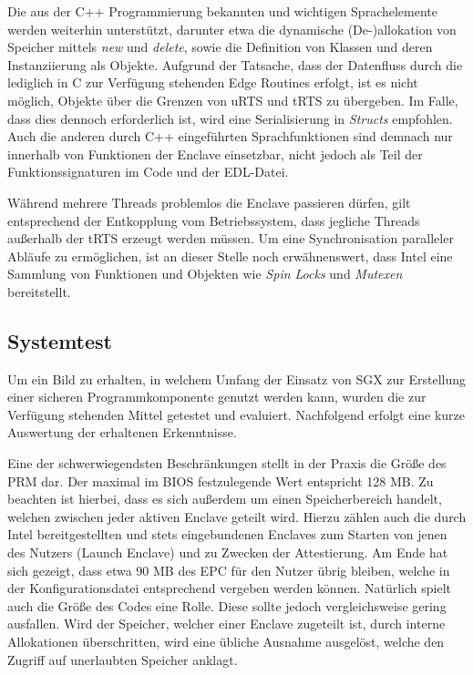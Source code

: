Die aus der C++ Programmierung bekannten und wichtigen Sprachelemente werden weiterhin unterstützt, darunter etwa die dynamische (De-)allokation von Speicher mittels \textit{new} und \textit{delete}, sowie die Definition von Klassen und deren Instanziierung als Objekte. Aufgrund der Tatsache, dass der Datenfluss durch die lediglich in C zur Verfügung stehenden Edge Routines erfolgt, ist es nicht möglich, Objekte über die Grenzen von uRTS und tRTS zu übergeben. Im Falle, dass dies dennoch erforderlich ist, wird eine Serialisierung in \textit{Structs} empfohlen. Auch die anderen durch C++ eingeführten Sprachfunktionen sind demnach nur innerhalb von Funktionen der Enclave einsetzbar, nicht jedoch als Teil der Funktionssignaturen im Code und der EDL-Datei.

Während mehrere Threads problemlos die Enclave passieren dürfen, gilt entsprechend der Entkopplung vom Betriebssystem, dass jegliche Threads außerhalb der tRTS erzeugt werden müssen. Um eine Synchronisation paralleler Abläufe zu ermöglichen, ist an dieser Stelle noch erwähnenswert, dass Intel eine Sammlung von Funktionen und Objekten wie \textit{Spin Locks} und \textit{Mutexen} bereitstellt.

\subsection{Systemtest}

Um ein Bild zu erhalten, in welchem Umfang der Einsatz von SGX zur Erstellung einer sicheren Programmkomponente genutzt werden kann, wurden die zur Verfügung stehenden Mittel getestet und evaluiert. Nachfolgend erfolgt eine kurze Auswertung der erhaltenen Erkenntnisse.

Eine der schwerwiegendsten Beschränkungen stellt in der Praxis die Größe des PRM dar. Der maximal im BIOS festzulegende Wert entspricht 128 MB. Zu beachten ist hierbei, dass es sich außerdem um einen Speicherbereich handelt, welchen zwischen jeder aktiven Enclave geteilt wird. Hierzu zählen auch die durch Intel bereitgestellten und stets eingebundenen Enclaves zum Starten von jenen des Nutzers (Launch Enclave) und zu Zwecken der Attestierung. Am Ende hat sich gezeigt, dass etwa 90 MB des EPC für den Nutzer übrig bleiben, welche in der Konfigurationsdatei entsprechend vergeben werden können. Natürlich spielt auch die Größe des Codes eine Rolle. Diese sollte jedoch vergleichsweise gering ausfallen. Wird der Speicher, welcher einer Enclave zugeteilt ist, durch interne Allokationen überschritten, wird eine übliche Ausnahme ausgelöst, welche den Zugriff auf unerlaubten Speicher anklagt.

